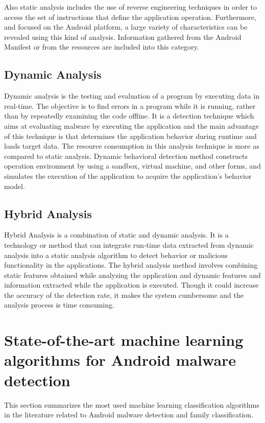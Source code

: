 Also static analysis includes the use of
reverse engineering techniques in order to access the set of instructions that define the application
operation. Furthermore, and focused on the Android platform, a large variety of characteristics
can be revealed using this kind of analysis. Information gathered from the Android Manifest or
from the resources are included into this category.

\subsection{Dynamic Analysis}

Dynamic analysis is the testing and evaluation of a program by executing data in real-time. The objective is to find errors in a
program while it is running, rather than by repeatedly examining the code offline. It is a detection technique which aims at
evaluating malware by executing the application and the main advantage of this technique is that determines the application
behavior during runtime and loads target data. The resource consumption in this analysis technique is more as compared to static
analysis. Dynamic behavioral detection method constructs operation environment by using a sandbox, virtual machine, and other
forms, and simulates the execution of the application to acquire the application’s behavior model.

\subsection{Hybrid Analysis}

Hybrid Analysis is a combination of static and dynamic analysis. It is a technology or method that can integrate run-time data
extracted from dynamic analysis into a static analysis algorithm to detect behavior or malicious functionality in the applications.
The hybrid analysis method involves combining static features obtained while analyzing the application and dynamic features and
information extracted while the application is executed. Though it could increase the accuracy of the detection rate, it makes the
system cumbersome and the analysis process is time consuming. 

\section{State-of-the-art machine learning algorithms for Android malware detection}

This section summarizes the most used machine learning classification algorithms in the literature
related to Android malware detection and family classification.

